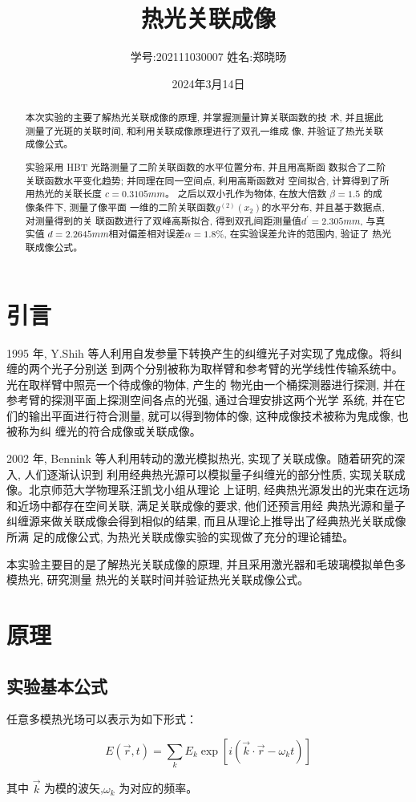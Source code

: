 \documentclass[12pt,a4paper]{article}
\title{\vspace{-4cm}\Large 热光关联成像}  %
\author{\kaishu 学号:202111030007 \hspace{2cm} 姓名:郑晓旸}   %
\date{2024年3月14日}
\newcommand{\be}[1]{
    \begin{equation}
        #1
    \end{equation}
}
\begin{document}
\maketitle

\begin{abstract}
    本次实验的主要了解热光关联成像的原理, 并掌握测量计算关联函数的技
术, 并且据此测量了光斑的关联时间, 和利用关联成像原理进行了双孔一维成
像, 并验证了热光关联成像公式。

实验采用 HBT 光路测量了二阶关联函数的水平位置分布, 并且用高斯函
数拟合了二阶关联函数水平变化趋势; 并同理在同一空间点, 利用高斯函数对
空间拟合, 计算得到了所用热光的关联长度 $c = 0.3105 mm$。
之后以双小孔作为物体, 在放大倍数 $\beta = 1.5$ 的成像条件下, 测量了像平面
一维的二阶关联函数$ g^{(2)}(x_2) $的水平分布, 并且基于数据点, 对测量得到的关
联函数进行了双峰高斯拟合, 得到双孔间距测量值$ d^{\prime} = 2.305mm$, 与真实值
$d = 2.2645mm $相对偏差相对误差$ \alpha = 1.8\%$, 
在实验误差允许的范围内, 验证了
热光联成像公式。
\end{abstract}

\section{引言}
1995 年, Y.Shih 等人利用自发参量下转换产生的纠缠光子对实现了鬼成像。将纠缠的两个光子分别送
到两个分别被称为取样臂和参考臂的光学线性传输系统中。光在取样臂中照亮一个待成像的物体, 产生的
物光由一个桶探测器进行探测, 并在参考臂的探测平面上探测空间各点的光强, 通过合理安排这两个光学
系统, 并在它们的输出平面进行符合测量, 就可以得到物体的像, 这种成像技术被称为鬼成像, 也被称为纠
缠光的符合成像或关联成像。

2002 年, Bennink 等人利用转动的激光模拟热光, 实现了关联成像。随着研究的深入, 人们逐渐认识到
利用经典热光源可以模拟量子纠缠光的部分性质, 实现关联成像。北京师范大学物理系汪凯戈小组从理论
上证明, 经典热光源发出的光束在远场和近场中都存在空间关联, 满足关联成像的要求, 他们还预言用经
典热光源和量子纠缠源来做关联成像会得到相似的结果, 而且从理论上推导出了经典热光关联成像所满
足的成像公式, 为热光关联成像实验的实现做了充分的理论铺垫。

本实验主要目的是了解热光关联成像的原理, 并且采用激光器和毛玻璃模拟单色多模热光, 研究测量
热光的关联时间并验证热光关联成像公式。


\section{原理}
\subsection{实验基本公式}
任意多模热光场可以表示为如下形式：
\be{E(\vec{r}, t)=\sum_{k} E_{k} \exp \left[i\left(\vec{k} \cdot \vec{r}-\omega_{k} t\right)\right]}
其中 $\vec k$ 为模的波矢,$\omega_k$ 为对应的频率。
\end{document}
